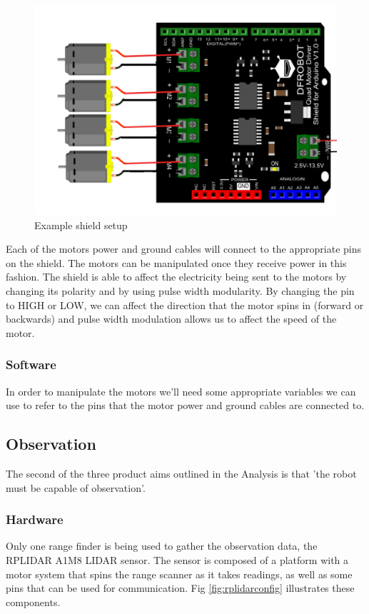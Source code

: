 				\begin{figure}[h]
					\centering
					\includegraphics[width=.7\linewidth]{SYNTHESIS/shield_connection.png}
					\caption{Example shield setup}
					\label{fig:shieldsetup}
				\end{figure}
				
				Each of the motors power and ground cables will connect to the appropriate pins on the shield. The motors can be manipulated once they receive power in this fashion. The shield is able to affect the electricity being sent to the motors by changing its polarity and by using pulse width modularity. By changing the pin to HIGH or LOW, we can affect the direction that the motor spins in (forward or backwards) and pulse width modulation allows us to affect the speed of the motor.
				
				\subsubsection{Software}
				In order to manipulate the motors we'll need some appropriate variables we can use to refer to the pins that the motor power and ground cables are connected to. 

				
			\subsection{Observation}
			The second of the three product aims outlined in the Analysis is that 'the robot must be capable of observation'.
				\subsubsection{Hardware}
				Only one range finder is being used to gather the observation data, the RPLIDAR A1M8 LIDAR sensor. The sensor is composed of a platform with a motor system that spins the range scanner as it takes readings, as well as some pins that can be used for communication. Fig \ref{fig:rplidarconfig} illustrates these components.
				
